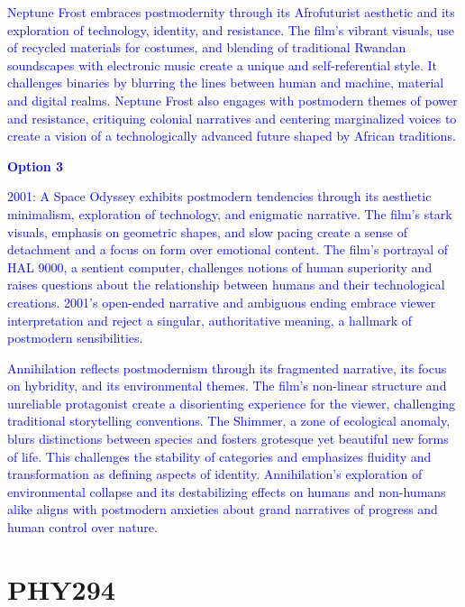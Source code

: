 \documentclass[11pt,fleqn]{book} %
\begin{document}
\begin{exercise}
    \textcolor{blue}{
Neptune Frost embraces postmodernity through its Afrofuturist aesthetic and its exploration of technology, identity, and resistance. The film's vibrant visuals, use of recycled materials for costumes, and blending of traditional Rwandan soundscapes with electronic music create a unique and self-referential style. It challenges binaries by blurring the lines between human and machine, material and digital realms.   Neptune Frost  also engages with postmodern themes of power and resistance, critiquing colonial narratives and centering marginalized voices to create a vision of a technologically advanced future shaped by African traditions.
}

    \textcolor{blue}{
\textbf{Option 3}
}

    \textcolor{blue}{
2001: A Space Odyssey exhibits postmodern tendencies through its aesthetic minimalism, exploration of technology, and enigmatic narrative. The film's stark visuals, emphasis on geometric shapes, and slow pacing create a sense of detachment and a focus on form over emotional content.  The film's portrayal of HAL 9000, a sentient computer, challenges notions of human superiority and raises questions about the relationship between humans and their technological creations.  2001's open-ended narrative and ambiguous ending embrace viewer interpretation and reject a singular, authoritative meaning, a hallmark of postmodern sensibilities.
}

    \textcolor{blue}{Annihilation reflects postmodernism through its fragmented narrative, its focus on hybridity, and its environmental themes.  The film's non-linear structure and unreliable protagonist create a disorienting experience for the viewer, challenging traditional storytelling conventions. The Shimmer, a zone of ecological anomaly,  blurs distinctions between species and fosters grotesque yet beautiful new forms of life. This challenges the stability of categories and emphasizes fluidity and transformation as defining aspects of identity. Annihilation's exploration of environmental collapse and its destabilizing effects on humans and non-humans alike aligns with postmodern anxieties about grand narratives of progress and human control over nature.}
\end{exercise}


\part{PHY294}

\end{document}
